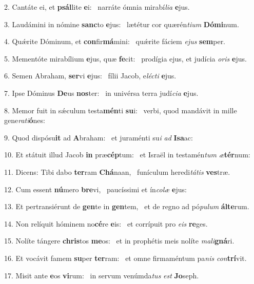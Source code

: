 2. Cantáte ei, et \textbf{psál}lite \textbf{e}i: \ast\  narráte ómnia mirabí\textit{li}\textit{a} \textbf{e}jus.\

3. Laudámini in nómine \textbf{sanc}to \textbf{e}jus: \ast\  lætétur cor quærén\textit{ti}\textit{um} \textbf{Dó}\textbf{mi}num.\

4. Quǽrite Dóminum, et \textbf{con}fir\textbf{má}mini: \ast\  quǽrite fáciem \textit{e}\textit{jus} \textbf{sem}per.\

5. Mementóte mirabílium \textbf{e}jus, quæ \textbf{fe}cit: \ast\  prodígia ejus, et judícia \textit{o}\textit{ris} \textbf{e}jus.\

6. Semen Abraham, \textbf{ser}vi \textbf{e}jus: \ast\  fílii Jacob, e\textit{léc}\textit{ti} \textbf{e}jus.\

7. Ipse Dóminus \textbf{De}us \textbf{nos}ter: \ast\  in univérsa terra judí\textit{ci}\textit{a} \textbf{e}jus.\

8. Memor fuit in sǽculum testa\textbf{mén}ti \textbf{su}i: \ast\  verbi, quod mandávit in mille gene\textit{ra}\textit{ti}\textbf{ó}nes:\

9. Quod dispósu\textbf{it} ad \textbf{A}braham: \ast\  et juraménti su\textit{i} \textit{ad} \textbf{I}\textbf{sa}ac:\

10. Et státuit illud Jacob \textbf{in} præ\textbf{cép}tum: \ast\  et Israël in testamén\textit{tum} \textit{æ}\textbf{tér}num:\

11. Dicens: Tibi dabo \textbf{ter}ram \textbf{Chá}naan, \ast\  funículum heredi\textit{tá}\textit{tis} \textbf{ves}træ.\

12. Cum essent \textbf{nú}mero \textbf{bre}vi, \ast\  paucíssimi et ín\textit{co}\textit{læ} \textbf{e}jus:\

13. Et pertransiérunt de \textbf{gen}te in \textbf{gen}tem, \ast\  et de regno ad pó\textit{pu}\textit{lum} \textbf{ál}\textbf{te}rum.\

14. Non relíquit hóminem no\textbf{cé}re \textbf{e}is: \ast\  et corrípuit pro \textit{e}\textit{is} \textbf{re}ges.\

15. Nolíte tángere \textbf{chris}tos \textbf{me}os: \ast\  et in prophétis meis nolíte \textit{ma}\textit{li}\textbf{gná}ri.\

16. Et vocávit famem \textbf{su}per \textbf{ter}ram: \ast\  et omne firmaméntum pa\textit{nis} \textit{con}\textbf{trí}vit.\

17. Misit ante \textbf{e}os \textbf{vi}rum: \ast\  in servum venúmda\textit{tus} \textit{est} \textbf{Jo}seph.\

